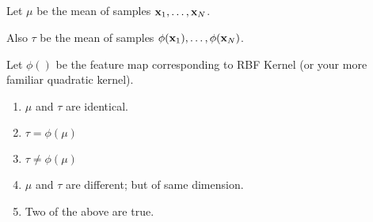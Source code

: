 \begin{frame}
\section{}
Let $\mu$ be the mean of samples ${\bf x}_1, \ldots, {\bf x}_N$.

Also $\tau$ be the mean of samples $\phi({\bf x}_1), \ldots, \phi({\bf x}_N)$.

Let $\phi()$ be the feature map corresponding to RBF Kernel (or your more familiar quadratic kernel).
\begin{enumerate}[label=(\Alph*)]
\item $\mu$ and $\tau$ are identical.
\item $\tau= \phi(\mu)$
\item $\tau \ne \phi(\mu)$    %
\item $\mu$ and $\tau$ are different; but of same dimension.
\item Two of the above are true.  %
\end{enumerate}
\end{frame}
